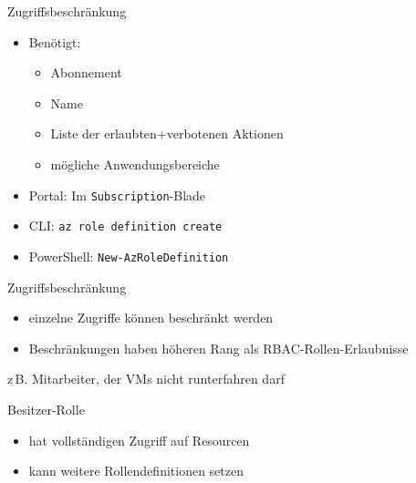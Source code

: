 

\begin{flashcard}[Definition]{Zugriffsbeschränkung}
    \begin{itemize}
        \item Benötigt:
            \begin{itemize}
                \item Abonnement
                \item Name
                \item Liste der erlaubten+verbotenen Aktionen
                \item mögliche Anwendungsbereiche
            \end{itemize}
        \item Portal: Im \texttt{Subscription}-Blade
        \item CLI: \texttt{az role definition create}
        \item PowerShell: \texttt{New-AzRoleDefinition}
    \end{itemize}
\end{flashcard}


\begin{flashcard}[Definition]{Zugriffsbeschränkung}
    \begin{itemize}
        \item einzelne Zugriffe können beschränkt werden
        \item Beschränkungen haben höheren Rang als RBAC-Rollen-Erlaubnisse
    \end{itemize}
    \vspace{1cm}
    z\,B. Mitarbeiter, der VMs nicht runterfahren darf
\end{flashcard}

\begin{flashcard}[Definition]{Besitzer-Rolle}
    \begin{itemize}
        \item hat vollständigen Zugriff auf Resourcen
        \item kann weitere Rollendefinitionen setzen
    \end{itemize}
\end{flashcard}

